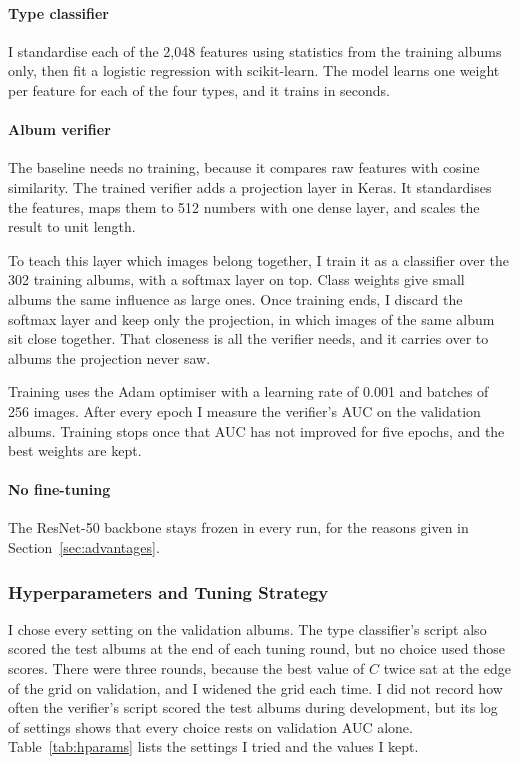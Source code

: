 \documentclass[conference]{IEEEtran}
\begin{document}
\paragraph{Type classifier} I standardise each of the 2,048 features using statistics from the training albums only, then fit a logistic regression with scikit-learn. The model learns one weight per feature for each of the four types, and it trains in seconds.

\paragraph{Album verifier} The baseline needs no training, because it compares raw features with cosine similarity. The trained verifier adds a projection layer in Keras. It standardises the features, maps them to 512 numbers with one dense layer, and scales the result to unit length.

To teach this layer which images belong together, I train it as a classifier over the 302 training albums, with a softmax layer on top. Class weights give small albums the same influence as large ones. Once training ends, I discard the softmax layer and keep only the projection, in which images of the same album sit close together. That closeness is all the verifier needs, and it carries over to albums the projection never saw.

Training uses the Adam optimiser with a learning rate of 0.001 and batches of 256 images. After every epoch I measure the verifier's AUC on the validation albums. Training stops once that AUC has not improved for five epochs, and the best weights are kept.

\paragraph{No fine-tuning} The ResNet-50 backbone stays frozen in every run, for the reasons given in Section~\ref{sec:advantages}.

\subsubsection{Hyperparameters and Tuning Strategy}\label{sec:tuning}
I chose every setting on the validation albums. The type classifier's script also scored the test albums at the end of each tuning round, but no choice used those scores. There were three rounds, because the best value of $C$ twice sat at the edge of the grid on validation, and I widened the grid each time. I did not record how often the verifier's script scored the test albums during development, but its log of settings shows that every choice rests on validation AUC alone. Table~\ref{tab:hparams} lists the settings I tried and the values I kept.
\end{document}
